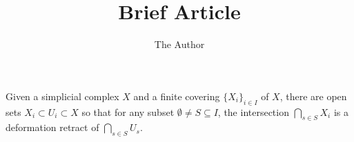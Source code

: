 \documentclass[11pt, oneside]{article}   	%
\title{Brief Article}
\author{The Author}
\begin{document}
\maketitle

 Given a simplicial complex $X$  and a finite covering $\{X_i\}_{i\in I}$ of $X$, there are open sets $ X_i \subset U_i \subset X$ so that for any subset $ \emptyset \neq S \subseteq I$, the intersection $\bigcap _{s \in S} X_i$ is a deformation retract of 
$\bigcap _{s \in S} U_s$.  
\end{document}
